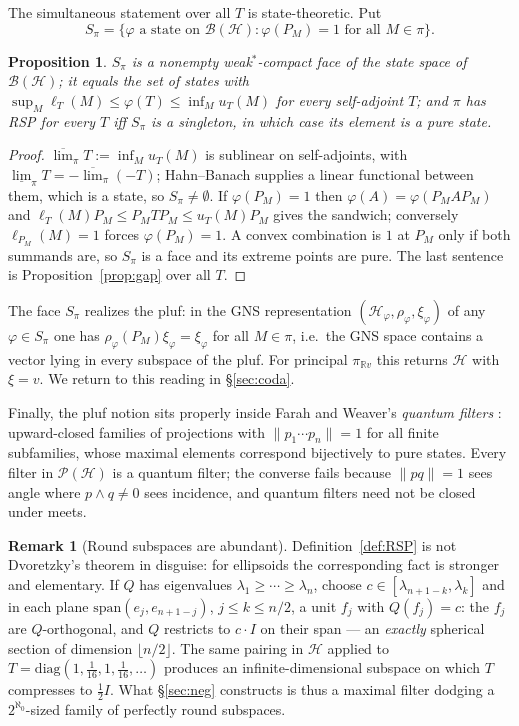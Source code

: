 \documentclass[11pt,reqno]{amsart}
\newtheorem{proposition}[theorem]{Proposition}
\theoremstyle{definition}
\newtheorem{remark}[theorem]{Remark}
\newcommand{\HH}{\mathcal{H}}
\newcommand{\PP}{\mathcal{P}}
\newcommand{\BH}{\mathcal{B}(\HH)}
\newcommand{\R}{\mathbb{R}}
\newcommand{\pluf}{\pi}
\begin{document}
The simultaneous statement over all $T$ is state-theoretic. Put
\[
S_\pluf=\{\varphi\text{ a state on }\BH:\varphi(P_M)=1\text{ for all }M\in\pluf\}.
\]

\begin{proposition}\label{prop:face}
$S_\pluf$ is a nonempty weak$^*$-compact face of the state space of $\BH$; it equals the
set of states with
$\sup_M\ell_T(M)\le\varphi(T)\le\inf_Mu_T(M)$ for every self-adjoint $T$; and $\pluf$ has
RSP for every $T$ iff $S_\pluf$ is a singleton, in which case its element is a pure
state.
\end{proposition}

\begin{proof}
$\overline{\lim}_\pluf T:=\inf_Mu_T(M)$ is sublinear on self-adjoints, with
$\underline{\lim}_\pluf T=-\overline{\lim}_\pluf(-T)$; Hahn--Banach supplies a linear
functional between them, which is a state, so $S_\pluf\neq\emptyset$. If $\varphi(P_M)=1$
then $\varphi(A)=\varphi(P_MAP_M)$ and
$\ell_T(M)P_M\le P_MTP_M\le u_T(M)P_M$ gives the sandwich; conversely
$\ell_{P_M}(M)=1$ forces $\varphi(P_M)=1$. A convex combination is $1$ at $P_M$ only if
both summands are, so $S_\pluf$ is a face and its extreme points are pure. The last
sentence is Proposition~\ref{prop:gap} over all $T$.
\end{proof}

The face $S_\pluf$ realizes the pluf: in the GNS representation
$(\HH_\varphi,\rho_\varphi,\xi_\varphi)$ of any $\varphi\in S_\pluf$ one has
$\rho_\varphi(P_M)\xi_\varphi=\xi_\varphi$ for all $M\in\pluf$, i.e.\ the GNS space
contains a vector lying in every subspace of the pluf. For principal $\pluf_{\R v}$ this
returns $\HH$ with $\xi=v$. We return to this reading in \S\ref{sec:coda}.

Finally, the pluf notion sits properly inside Farah and Weaver's \emph{quantum filters}
\cite{FarahWofsey,WeaverQMC}: upward-closed families of projections with
$\|p_1\cdots p_n\|=1$ for all finite subfamilies, whose maximal elements correspond
bijectively to pure states. Every filter in $\PP(\HH)$ is a quantum filter; the converse
fails because $\|pq\|=1$ sees angle where $p\wedge q\neq0$ sees incidence, and quantum
filters need not be closed under meets.

\begin{remark}[Round subspaces are abundant]\label{rem:dvoretzky}
Definition~\ref{def:RSP} is not Dvoretzky's theorem in disguise: for ellipsoids the
corresponding fact is stronger and elementary. If $Q$ has eigenvalues
$\lambda_1\ge\cdots\ge\lambda_n$, choose $c\in[\lambda_{n+1-k},\lambda_k]$ and in each
plane $\mathrm{span}(e_j,e_{n+1-j})$, $j\le k\le n/2$, a unit $f_j$ with $Q(f_j)=c$: the
$f_j$ are $Q$-orthogonal, and $Q$ restricts to $c\cdot I$ on their span --- an
\emph{exactly} spherical section of dimension $\lfloor n/2\rfloor$. The same pairing in
$\HH$ applied to $T=\mathrm{diag}(1,\tfrac1{16},1,\tfrac1{16},\dots)$ produces an
infinite-dimensional subspace on which $T$ compresses to $\tfrac12I$. What
\S\ref{sec:neg} constructs is thus a maximal filter dodging a $2^{\aleph_0}$-sized family
of perfectly round subspaces.
\end{remark}
\end{document}
